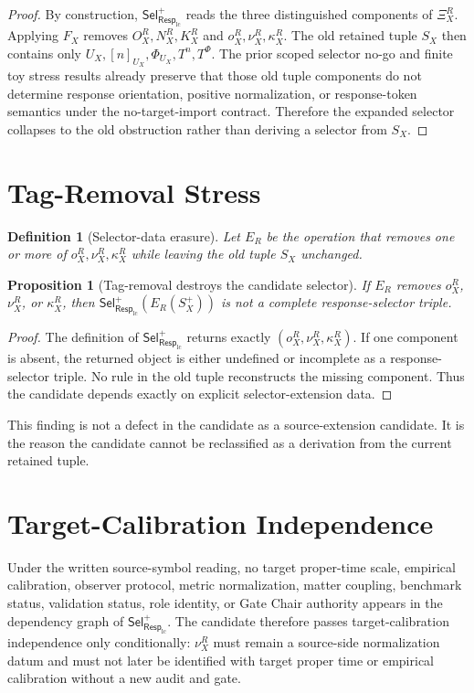 \documentclass[11pt]{article}
\newcommand{\RespLC}{\mathsf{Resp}_{\mathrm{lc}}}
\newcommand{\SelResp}{\mathsf{Sel}_{\RespLC}}
\newcommand{\XiR}{\Xi_X^R}
\newcommand{\SX}{S_X}
\newcommand{\Splus}{S_X^+}
\newtheorem{definition}{Definition}
\newtheorem{proposition}{Proposition}
\begin{document}
\begin{proof}
By construction, \(\SelResp^{+}\) reads the three distinguished
components of \(\XiR\). Applying \(F_X\) removes \(O_X^R,N_X^R,K_X^R\)
and \(o_X^R,\nu_X^R,\kappa_X^R\). The old retained tuple \(\SX\) then
contains only \(U_X,[n]_{U_X},\Phi_{U_X},T^n,T^\Phi\). The prior scoped
selector no-go and finite toy stress results already preserve that
those old tuple components do not determine response orientation,
positive normalization, or response-token semantics under the
no-target-import contract. Therefore the expanded selector collapses to
the old obstruction rather than deriving a selector from \(\SX\).
\end{proof}

\section{Tag-Removal Stress}

\begin{definition}[Selector-data erasure]
Let \(E_R\) be the operation that removes one or more of
\(o_X^R,\nu_X^R,\kappa_X^R\) while leaving the old tuple \(\SX\)
unchanged.
\end{definition}

\begin{proposition}[Tag-removal destroys the candidate selector]
If \(E_R\) removes \(o_X^R\), \(\nu_X^R\), or \(\kappa_X^R\), then
\(\SelResp^{+}(E_R(\Splus))\) is not a complete response-selector
triple.
\end{proposition}

\begin{proof}
The definition of \(\SelResp^{+}\) returns exactly
\((o_X^R,\nu_X^R,\kappa_X^R)\). If one component is absent, the returned
object is either undefined or incomplete as a response-selector triple.
No rule in the old tuple reconstructs the missing component. Thus the
candidate depends exactly on explicit selector-extension data.
\end{proof}

This finding is not a defect in the candidate as a source-extension
candidate. It is the reason the candidate cannot be reclassified as a
derivation from the current retained tuple.

\section{Target-Calibration Independence}

Under the written source-symbol reading, no target proper-time scale,
empirical calibration, observer protocol, metric normalization, matter
coupling, benchmark status, validation status, role identity, or Gate
Chair authority appears in the dependency graph of
\(\SelResp^{+}\). The candidate therefore passes target-calibration
independence only conditionally: \(\nu_X^R\) must remain a source-side
normalization datum and must not later be identified with target proper
time or empirical calibration without a new audit and gate.
\end{document}
